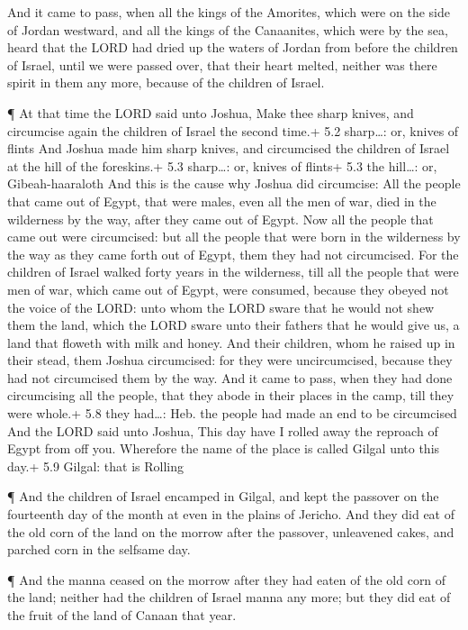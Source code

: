  And it came to pass, when all the kings of the Amorites,
which were on the side of Jordan westward, and all the kings of the
Canaanites, which were by the sea, heard that the LORD had dried up the
waters of Jordan from before the children of Israel, until we were
passed over, that their heart melted, neither was there spirit in them
any more, because of the children of Israel.

 ¶ At that time the LORD said unto Joshua, Make thee sharp
knives, and circumcise again the children of Israel the second time.+
5.2 sharp\ldots: or, knives of flints  And Joshua made him
sharp knives, and circumcised the children of Israel at the hill of the
foreskins.+ 5.3 sharp\ldots: or, knives of flints+ 5.3 the hill\ldots:
or, Gibeah-haaraloth  And this is the cause why Joshua did
circumcise: All the people that came out of Egypt, that were males, even
all the men of war, died in the wilderness by the way, after they came
out of Egypt.  Now all the people that came out were
circumcised: but all the people that were born in the wilderness by the
way as they came forth out of Egypt, them they had not circumcised.
 For the children of Israel walked forty years in the
wilderness, till all the people that were men of war, which came out of
Egypt, were consumed, because they obeyed not the voice of the LORD:
unto whom the LORD sware that he would not shew them the land, which the
LORD sware unto their fathers that he would give us, a land that floweth
with milk and honey.  And their children, whom he raised up
in their stead, them Joshua circumcised: for they were uncircumcised,
because they had not circumcised them by the way.  And it
came to pass, when they had done circumcising all the people, that they
abode in their places in the camp, till they were whole.+ 5.8 they
had\ldots: Heb. the people had made an end to be circumcised
 And the LORD said unto Joshua, This day have I rolled away
the reproach of Egypt from off you. Wherefore the name of the place is
called Gilgal unto this day.+ 5.9 Gilgal: that is Rolling

 ¶ And the children of Israel encamped in Gilgal, and kept
the passover on the fourteenth day of the month at even in the plains of
Jericho.  And they did eat of the old corn of the land on
the morrow after the passover, unleavened cakes, and parched corn in the
selfsame day.

 ¶ And the manna ceased on the morrow after they had eaten
of the old corn of the land; neither had the children of Israel manna
any more; but they did eat of the fruit of the land of Canaan that year.

